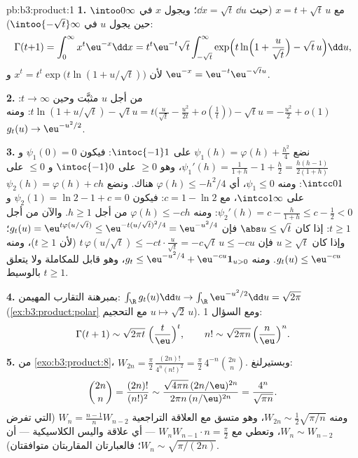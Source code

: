 \begin{solution}{pb:b3:product:1}
\textbf{1.} مع $x = t + \sqrt t\,u$ (حيث $\dd x = \sqrt
t\,\dd u$؛ ويجول $x$ في $\intoo0\infty$
حين يجول $u$ في
$\intoo{-\sqrt t}\infty$):
\[
\Gamma(t{+}1) = \int_0^\infty x^t\eu^{-x}\dd x
= t^t\eu^{-t}\sqrt t\int_{-\sqrt t}^{\infty}
\exp\Bigl(t\ln\Bigl(1 + \frac u{\sqrt t}\Bigr) - \sqrt
t\,u\Bigr)\dd u,
\]
لأن $x^t = t^t\exp\bigl(t\ln(1 + u/\sqrt t)\bigr)$ و
$\eu^{-x} = \eu^{-t}\eu^{-\sqrt tu}$.

\textbf{2.} من أجل $u$ مثبَّت وحين $t \to \infty$: $t\ln(1 +
u/\sqrt t) - \sqrt tu = t\bigl(\frac u{\sqrt t} -
\frac{u^2}{2t} + o(\frac1t)\bigr) - \sqrt tu = -\frac{u^2}2 +
o(1)$:
ومنه $g_t(u) \to \eu^{-u^2/2}$.

\textbf{3.} نضع $\psi_1(h) = \varphi(h) + \frac{h^2}4$ على
$\intoc{-1}1$: فيكون $\psi_1(0) = 0$ و $\psi_1'(h) = \frac1{1+h} -
1 + \frac h2 = \frac{h(h-1)}{2(1+h)}$، وهو $\geq 0$
على $\intoc{-1}0$ و $\leq 0$ على $\intcc01$: ومنه
$\psi_1 \leq 0$، أي $\varphi(h) \leq -h^2/4$ هناك. ونضع $\psi_2(h) =
\varphi(h) + ch$ على
$\intco1\infty$، مع $c = 1 - \ln2$: فيكون $\psi_2(1)
= \ln2 - 1 + c = 0$ و $\psi_2'(h) = c - \frac h{1+h} \leq c -
\frac12 < 0$:
ومنه $\varphi(h) \leq -ch$ من أجل $h \geq 1$. والآن من أجل $t
\geq 1$: إذا كان
$\abs u \leq \sqrt t$ فإن $g_t(u) =
\eu^{t\varphi(u/\sqrt t)} \leq \eu^{-t(u/\sqrt t)^2/4} =
\eu^{-u^2/4}$؛ وإذا كان $u \geq \sqrt t$ فإن $t\,\varphi(u/\sqrt t) \leq
-ct\cdot\frac u{\sqrt t} = -c\sqrt t\,u \leq -cu$
(لأن $t \geq
1$)، ومنه $g_t(u) \leq \eu^{-cu}$. ومنه $g_t \leq \eu^{-u^2/4} +
\eu^{-cu}\mathbf 1_{u>0}$، وهو قابل للمكاملة
ولا يتعلق بالوسيط $t \geq
1$.

\textbf{4.} بمبرهنة التقارب المهيمن: $\int_\R g_t(u)\dd u \to
\int_\R\eu^{-u^2/2}\dd u = \sqrt{2\pi}$
(\cref{ex:b3:product:polar} مع التحجيم
$u\mapsto\sqrt2\,u$). ومع السؤال 1:
\[
\Gamma(t + 1) \sim \sqrt{2\pi t}\;\Bigl(\frac
t\eu\Bigr)^t,\qquad
n! \sim \sqrt{2\pi n}\,\Bigl(\frac n\eu\Bigr)^n .
\]

\textbf{5.} من \cref{exo:b3:product:8}، $W_{2n} =
\frac\pi2\,\frac{(2n)!}{4^n(n!)^2} =
\frac\pi2\,4^{-n}\binom{2n}n$. وبستيرلنغ:
\[
\binom{2n}{n} = \frac{(2n)!}{(n!)^2}
\sim \frac{\sqrt{4\pi n}\,(2n/\eu)^{2n}}
{2\pi n\,(n/\eu)^{2n}} = \frac{4^n}{\sqrt{\pi n}} .
\]
ومنه $W_{2n} \sim \frac12\sqrt{\pi/n}$، وهو متسق مع العلاقة التراجعية
$W_n = \frac{n-1}nW_{n-2}$ (التي تفرض $W_n \sim
W_{n-2}$، وتعطي مع $W_nW_{n-1}\cdot n = \frac\pi2$ --- أي علاقة
واليس الكلاسيكية --- أن $W_n \sim
\sqrt{\pi/(2n)}$؛ فالعبارتان المقاربتان
متوافقتان).


\end{solution}
